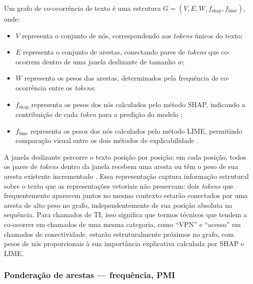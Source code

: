 \documentclass[
    12pt,                %
    openright,           %
    oneside,             %
    a4paper,             %
    english,             %
    brazil               %
]{abntex2}
\begin{document}
Um grafo de co-ocorrência de texto é uma estrutura 
$G = (V, E, W, f_{\text{shap}}, f_{\text{lime}})$, onde:

\begin{itemize}
    \item $V$ representa o conjunto de nós, correspondendo aos 
    \textit{tokens} únicos do texto;
    
    \item $E$ representa o conjunto de arestas, conectando pares 
    de \textit{tokens} que co-ocorrem dentro de uma janela 
    deslizante de tamanho $w$;
    
    \item $W$ representa os pesos das arestas, determinados pela 
    frequência de co-ocorrência entre os \textit{tokens};
    
    \item $f_{\text{shap}}$ representa os pesos dos nós calculados 
    pelo método SHAP, indicando a contribuição de cada 
    \textit{token} para a predição do modelo \cite{lundberg2017};
    
    \item $f_{\text{lime}}$ representa os pesos dos nós calculados 
    pelo método LIME, permitindo comparação visual entre os dois 
    métodos de explicabilidade \cite{ribeiro2016}.
\end{itemize}

A janela deslizante percorre o texto posição por posição; em cada 
posição, todos os pares de \textit{tokens} dentro da janela 
recebem uma aresta ou têm o peso de sua aresta existente 
incrementado \cite{yao2019}. Essa representação captura informação 
estrutural sobre o texto que as representações vetoriais não 
preservam: dois \textit{tokens} que frequentemente aparecem juntos 
no mesmo contexto estarão conectados por uma aresta de alto peso 
no grafo, independentemente de sua posição absoluta na sequência. 
Para chamados de TI, isso significa que termos técnicos que tendem 
a co-ocorrer em chamados de uma mesma categoria, como ``VPN'' e 
``acesso'' em chamados de conectividade, estarão estruturalmente 
próximos no grafo, com pesos de nós proporcionais à sua 
importância explicativa calculada por SHAP e LIME.
\subsubsection{Ponderação de arestas — frequência, PMI}
\label{subsubsec:grafos_ponderacao}
\end{document}
